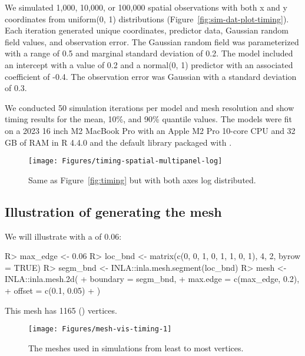\documentclass[article]{jss}\usepackage[]{graphicx}\usepackage[dvipsnames]{xcolor}
\newcommand{\R}{\proglang{R}}
\begin{document}
We simulated 1,000, 10,000, or 100,000 spatial observations with both x and y coordinates from uniform(0, 1) distributions (Figure~\ref{fig:sim-dat-plot-timing}).
Each iteration generated unique coordinates, predictor data, Gaussian random field values, and observation error.
The Gaussian random field was parameterized with a range of 0.5 and marginal standard deviation of 0.2.
The model included an intercept with a value of 0.2 and a normal(0, 1) predictor with an associated coefficient of -0.4.
The observation error was Gaussian with a standard deviation of 0.3.

We conducted 50 simulation iterations per model and mesh resolution and show timing results for the mean, 10\%, and 90\% quantile values.
The models were fit on a 2023 16 inch M2 MacBook Pro with an Apple M2 Pro 10-core CPU and 32 GB of RAM in R 4.4.0 and the default  library packaged with \R \citep{r2024}.

\begin{figure}[htb]
\centering
\texttt{[image: Figures/timing-spatial-multipanel-log]}
\caption[]{
  Same as Figure~\ref{fig:timing} but with both axes log distributed.
}
\label{fig:timing2}
\end{figure}

\clearpage

\subsection[Illustration of generating the INLA mesh]{Illustration of generating the  mesh}



We will illustrate with a  of 0.06:

\begin{Schunk}
\begin{Sinput}
R> max_edge <- 0.06
R> loc_bnd <- matrix(c(0, 0, 1, 0, 1, 1, 0, 1), 4, 2, byrow = TRUE)
R> segm_bnd <- INLA::inla.mesh.segment(loc_bnd)
R> mesh <- INLA::inla.mesh.2d(
+    boundary = segm_bnd,
+    max.edge = c(max_edge, 0.2),
+    offset = c(0.1, 0.05)
+  )
\end{Sinput}
\end{Schunk}



This mesh has 1165 () vertices.

\begin{Schunk}
\begin{figure}[ht]

{\centering \texttt{[image: Figures/mesh-vis-timing-1]}

}

\caption[The meshes used in simulations from least to most vertices]{The meshes used in simulations from least to most vertices.}\label{fig:mesh-vis-timing}
\end{figure}
\end{Schunk}
\end{document}
